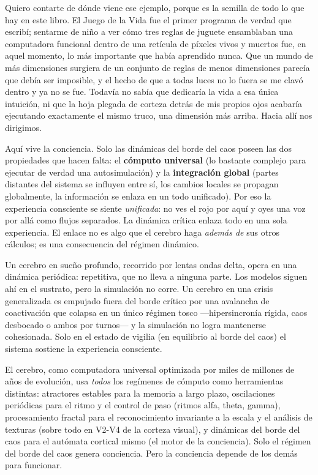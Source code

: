\documentclass[11pt, twoside, openright]{book}
\begin{document}
Quiero contarte de dónde viene ese ejemplo, porque es la semilla de todo lo que hay en este libro. El Juego de la Vida fue el primer programa de verdad que escribí; sentarme de niño a ver cómo tres reglas de juguete ensamblaban una computadora funcional dentro de una retícula de píxeles vivos y muertos fue, en aquel momento, lo más importante que había aprendido nunca. Que un mundo de más dimensiones surgiera de un conjunto de reglas de menos dimensiones parecía que debía ser imposible, y el hecho de que a todas luces no lo fuera se me clavó dentro y ya no se fue. Todavía no sabía que dedicaría la vida a esa única intuición, ni que la hoja plegada de corteza detrás de mis propios ojos acabaría ejecutando exactamente el mismo truco, una dimensión más arriba. Hacia allí nos dirigimos.

Aquí vive la conciencia. Solo las dinámicas del borde del caos poseen las dos propiedades que hacen falta: el \textbf{cómputo universal} (lo bastante complejo para ejecutar de verdad una autosimulación) y la \textbf{integración global} (partes distantes del sistema se influyen entre sí, los cambios locales se propagan globalmente, la información se enlaza en un todo unificado). Por eso la experiencia consciente se siente \textit{unificada}: no ves el rojo por aquí y oyes una voz por allá como flujos separados. La dinámica crítica enlaza todo en una sola experiencia. El enlace no es algo que el cerebro haga \textit{además de} sus otros cálculos; es una consecuencia del régimen dinámico.

Un cerebro en sueño profundo, recorrido por lentas ondas delta, opera en una dinámica periódica: repetitiva, que no lleva a ninguna parte. Los modelos siguen ahí en el sustrato, pero la simulación no corre. Un cerebro en una crisis generalizada es empujado fuera del borde crítico por una avalancha de coactivación que colapsa en un único régimen tosco ---hipersincronía rígida, caos desbocado o ambos por turnos--- y la simulación no logra mantenerse cohesionada. Solo en el estado de vigilia (en equilibrio al borde del caos) el sistema sostiene la experiencia consciente.

El cerebro, como computadora universal optimizada por miles de millones de años de evolución, usa \textit{todos} los regímenes de cómputo como herramientas distintas: atractores estables para la memoria a largo plazo, oscilaciones periódicas para el ritmo y el control de paso (ritmos alfa, theta, gamma), procesamiento fractal para el reconocimiento invariante a la escala y el análisis de texturas (sobre todo en V2-V4 de la corteza visual), y dinámicas del borde del caos para el autómata cortical mismo (el motor de la conciencia). Solo el régimen del borde del caos genera conciencia. Pero la conciencia depende de los demás para funcionar.
\end{document}
